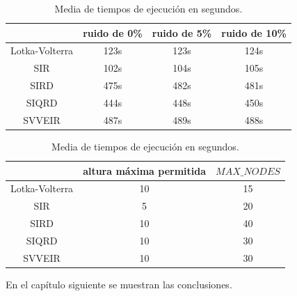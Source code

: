 \begin{table}[!h]
    \centering
    \caption{Media de tiempos de ejecución en segundos.}
    \begin{tabular}{|c|c|c|c|}
        \hline
                       & \textbf{ruido de 0\%} & \textbf{ruido de 5\%} & \textbf{ruido de 10\%} \\
        \hline
        Lotka-Volterra & 123s                  & 123s                  & 124s                   \\
        \hline
        SIR            & 102s                  & 104s                  & 105s                   \\
        \hline
        SIRD           & 475s                  & 482s                  & 481s                   \\
        \hline
        SIQRD          & 444s                  & 448s                  & 450s                   \\
        \hline
        SVVEIR         & 487s                  & 489s                  & 488s                   \\
        \hline
    \end{tabular}

    \begin{tabular}{|c|c|c|}
        \hline
                       & \textbf{altura máxima permitida} & $MAX\_NODES$ \\
        \hline
        Lotka-Volterra & 10                               & 15           \\
        \hline
        SIR            & 5                                & 20           \\
        \hline
        SIRD           & 10                               & 40           \\
        \hline
        SIQRD          & 10                               & 30           \\
        \hline
        SVVEIR         & 10                               & 30           \\
        \hline
    \end{tabular}
    \label{table:experiments_times}
\end{table}

En el capítulo siguiente se muestran las conclusiones.